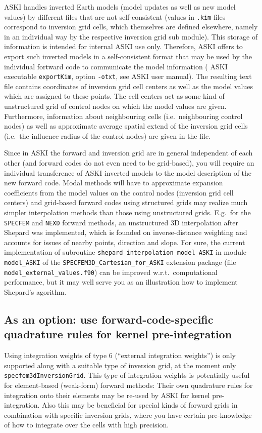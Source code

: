 \documentclass[12pt,a4paper]{article}
\newcommand{\lcode}[1]{\nolinkurl{#1}}
\newcommand{\ASKI}{ {\ttfamily ASKI} }
\begin{document}
\ASKI{} handles inverted Earth models (model updates as well as new model values) by different files that are
not self-consistent (values in \lcode{.kim} files correspond to inversion grid cells, which themselves are defined
elsewhere, namely in an individual way by the respective inversion grid sub module). This storage of information
is intended for internal \ASKI{} use only. Therefore, \ASKI{} offers to export such inverted models in a 
self-consistent format that may be used by the individual fortward code to communicate the model information
(\ASKI{} executable \lcode{exportKim}, option \lcode{-otxt}, see \ASKI{} user manual). The resulting text file
contains coordinates of inversion grid cell centers as well as the model values which are assigned to these points.
The cell centers act as some kind of unstructured grid of control nodes on which the model values are given.
Furthermore, information about neighbouring cells (i.e.\ neighbouring control nodes) as well as approximate average
spatial extend of the inversion grid cells (i.e.\ the influence radius of the control nodes) are given in the file.

Since in \ASKI{} the forward and inversion grid are in general independent of each other (and forward codes do not
even need to be grid-based), you will require an individual transference of \ASKI{} inverted models to the model 
description of the new forward code. Modal methods will have to approximate expansion coefficients from the model
values on the control nodes (inversion grid cell centers) and grid-based forward codes using structured grids may 
realize much simpler interpolation methods than those using unstructured grids. E.g.\ for the \lcode{SPECFEM} and
\lcode{NEXD} forward methods, an unstructured 3D interpolation after Shepard \cite{Shepard68} was implemented, 
which is founded on inverse-distance weighting and accounts for issues of nearby points, direction and slope. 
For sure, the current implementation of subroutine \lcode{shepard_interpolation_model_ASKI} in module 
\lcode{model_ASKI} of the \lcode{SPECFEM3D_Cartesian_for_ASKI} extension package (file \lcode{model_external_values.f90})
can be improved w.r.t.\ computational performance, but it may well serve you as an illustration how to implement
Shepard's agorithm. 

\subsection{As an option: use forward-code-specific quadrature rules for kernel pre-integration} \label{ssec-extend:external_intw}
Using integration weights of type 6 (``external integration weights'') is only supported along with a suitable 
type of inversion grid, at the moment only \lcode{specfem3dInversionGrid}. This type of integration weights
is potentially useful for element-based (weak-form) forward methods: Their own quadrature rules for integration onto 
their elements may be re-used by ASKI for kernel pre-integration. Also this may be beneficial for special kinds of 
forward grids in combination with specific inversion grids, where you have certain pre-knowledge of how to 
integrate over the cells with high precision. 
\end{document}
